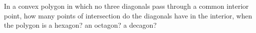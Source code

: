 In a convex polygon in which no three diagonals pass through a common interior point, how many points of intersection do the diagonals have in the interior, when the polygon is a hexagon? an octagon? a decagon?
